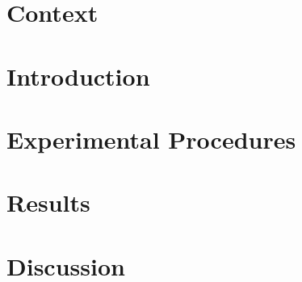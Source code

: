 
\section{Context} 
	
	 
	
\section{Introduction}

	 

\section{Experimental Procedures}

	 
	
\section{Results} 
	
	 

\section{Discussion}
		
	

